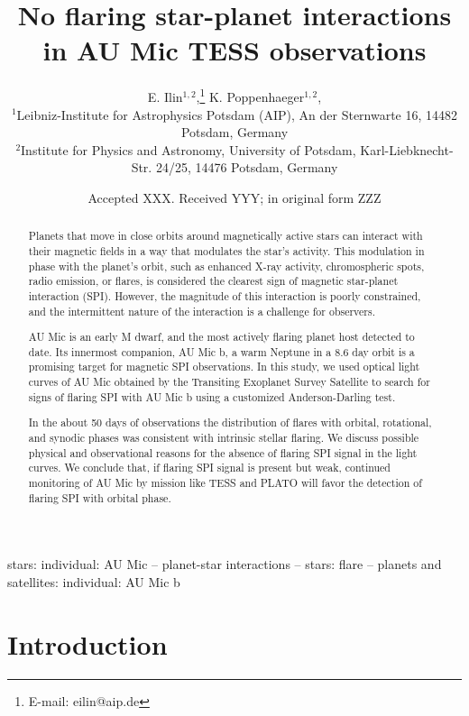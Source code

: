 \documentclass[fleqn,usenatbib,letters]{mnras}%
\title[]{No flaring star-planet interactions in AU Mic TESS observations}
\author[E. Ilin et al.]{
E. Ilin$^{1,2}$,\thanks{E-mail: eilin@aip.de}
K. Poppenhaeger$^{1,2}$,
\\
$^{1}$Leibniz-Institute for Astrophysics Potsdam (AIP), An der Sternwarte 16, 14482 Potsdam, Germany\\
$^{2}$Institute for Physics and Astronomy, University of Potsdam, Karl-Liebknecht-Str. 24/25, 14476 Potsdam, Germany
}
\date{Accepted XXX. Received YYY; in original form ZZZ}
\begin{document}
\label{firstpage}
\pagerange{\pageref{firstpage}--\pageref{lastpage}}
\maketitle

\begin{abstract}
Planets that move in close orbits around magnetically active stars can interact with their magnetic fields in a way that modulates the star's activity. This modulation in phase with the planet's orbit, such as enhanced X-ray activity, chromospheric spots, radio emission, or flares, is considered the clearest sign of magnetic star-planet interaction (SPI). However, the magnitude of this interaction is poorly constrained, and the intermittent nature of the interaction is a challenge for observers. 

AU Mic is an early M dwarf, and the most actively flaring planet host detected to date. Its innermost companion, AU Mic b, a warm Neptune in a 8.6 day orbit is a promising target for magnetic SPI observations. In this study, we used optical light curves of AU Mic obtained by the Transiting Exoplanet Survey Satellite to search for signs of flaring SPI with AU Mic b using a customized Anderson-Darling test. 

In the about 50 days of observations the distribution of flares with orbital, rotational, and synodic phases was consistent with intrinsic stellar flaring. We discuss possible physical and observational reasons for the absence of flaring SPI signal in the light curves. We conclude that, if flaring SPI signal is present but weak, continued monitoring of AU Mic by mission like TESS and PLATO will favor the detection of flaring SPI with orbital phase.

\end{abstract}

\begin{keywords}
stars: individual: AU Mic -- planet-star interactions -- stars: flare -- planets and satellites: individual: AU Mic b
\end{keywords}

%

\section{Introduction}
\end{document}
